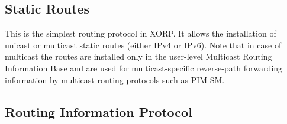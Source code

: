 \subsection{Static Routes}
\label{sec:protocols:static_routes}

This is the simplest routing protocol in XORP. It allows the
installation of unicast or multicast static routes (either IPv4 or
IPv6).  Note that in case of multicast the routes are installed only
in the user-level Multicast Routing Information Base and are used for
multicast-specific reverse-path forwarding information by multicast routing
protocols such as PIM-SM.

\vspace{0.1in}
\noindent{}
\vspace{0.1in}

\newpage
\subsection{Routing Information Protocol}
\label{sec:protocols:rip}

